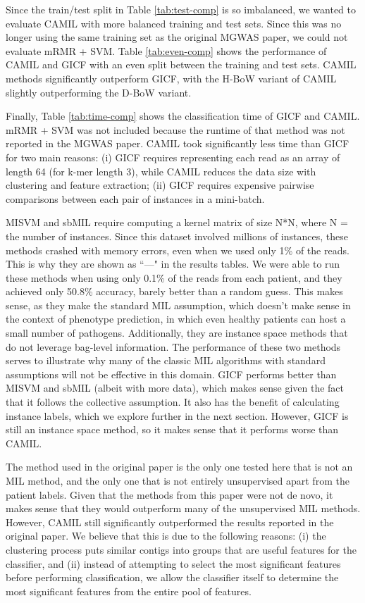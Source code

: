 Since the train/test split in Table \ref{tab:test-comp} is so imbalanced, we wanted to evaluate CAMIL with more balanced training and test sets. Since this was no longer using the same training set as the original MGWAS paper, we could not evaluate mRMR + SVM. Table \ref{tab:even-comp} shows the performance of CAMIL and GICF with an even split between the training and test sets. CAMIL methods significantly outperform GICF, with the H-BoW variant of CAMIL slightly outperforming the D-BoW variant. 

Finally, Table \ref{tab:time-comp} shows the classification time of GICF and CAMIL. mRMR + SVM was not included because the runtime of that method was not reported in the MGWAS paper. CAMIL took significantly less time than GICF for two main reasons: (i) GICF requires representing each read as an array of length 64 (for k-mer length 3), while CAMIL reduces the data size with clustering and feature extraction; (ii) GICF requires expensive pairwise comparisons between each pair of instances in a mini-batch.

MISVM and sbMIL require computing a kernel matrix of size N*N, where N = the number of instances. Since this dataset involved millions of instances, these methods crashed with memory errors, even when we used only 1\% of the reads. This is why they are shown as ``---" in the results tables. We were able to run these methods when using only 0.1\% of the reads from each patient, and they achieved only 50.8\% accuracy, barely better than a random guess. This makes sense, as they make the standard MIL assumption, which doesn't make sense in the context of phenotype prediction, in which even healthy patients can host a small number of pathogens. Additionally, they are instance space methods that do not leverage bag-level information. The performance of these two methods serves to illustrate why many of the classic MIL algorithms with standard assumptions will not be effective in this domain. GICF performs better than MISVM and sbMIL (albeit with more data), which makes sense given the fact that it follows the collective assumption. It also has the benefit of calculating instance labels, which we explore further in the next section. However, GICF is still an instance space method, so it makes sense that it performs worse than CAMIL.

The method used in the original paper is the only one tested here that is not an MIL method, and the only one that is not entirely unsupervised apart from the patient labels. Given that the methods from this paper were not de novo, it makes sense that they would outperform many of the unsupervised MIL methods. However, CAMIL still significantly outperformed the results reported in the original paper. We believe that this is due to the following reasons: (i) the clustering process puts similar contigs into groups that are useful features for the classifier, and (ii) instead of attempting to select the most significant features before performing classification, we allow the classifier itself to determine the most significant features from the entire pool of features.

